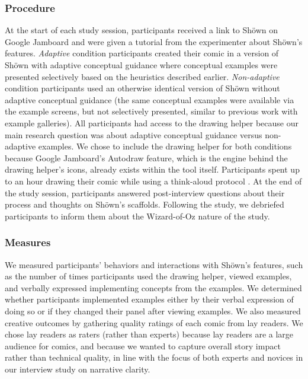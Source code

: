 \subsubsection{Procedure}
At the start of each study session, participants received a link to Sh{\"o}wn on Google Jamboard and were given a tutorial from the experimenter about Sh{\"o}wn’s features. \textit{Adaptive} condition participants created their comic in a version of Sh{\"o}wn with adaptive conceptual guidance where conceptual examples were presented selectively based on the heuristics described earlier. \textit{Non-adaptive} condition participants used an otherwise identical version of Sh{\"o}wn without adaptive conceptual guidance (the same conceptual examples were available via the example screens, but not selectively presented, similar to previous work with example galleries). All participants had access to the drawing helper because our main research question was about adaptive conceptual guidance versus non-adaptive examples. We chose to include the drawing helper for both conditions because Google Jamboard's Autodraw feature, which is the engine behind the drawing helper's icons, already exists within the tool itself.
Participants spent up to an hour drawing their comic while using a think-aloud protocol \cite{ericsson1984protocol}. At the end of the study session, participants answered post-interview questions about their process and thoughts on Sh{\"o}wn’s scaffolds. Following the study, we debriefed participants to inform them about the Wizard-of-Oz nature of the study.

\subsubsection{Measures}
We measured participants' behaviors and interactions with Sh{\"o}wn's features, such as the number of times participants used the drawing helper, viewed examples, and verbally expressed implementing concepts from the examples. We determined whether participants implemented examples either by their verbal expression of doing so or if they changed their panel after viewing examples. We also measured creative outcomes by gathering quality ratings of each comic from lay readers. We chose lay readers as raters (rather than experts) because lay readers are a large audience for comics, and because we wanted to capture overall story impact rather than technical quality, in line with the focus of both experts and novices in our interview study on narrative clarity.

